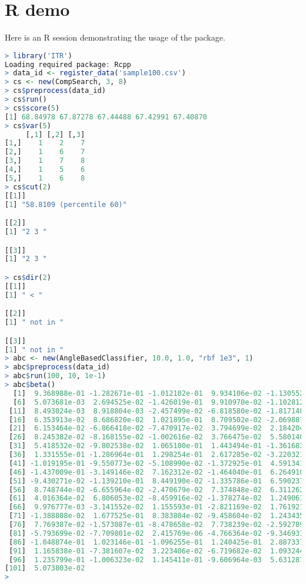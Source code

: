 \section{R demo}

Here is an R session demonstrating the usage of the package.

\begin{lstlisting}[language=R, showstringspaces=false]
> library('ITR')
Loading required package: Rcpp
> data_id <- register_data('sample100.csv')
> cs <- new(CompSearch, 3, 8)
> cs$preprocess(data_id)
> cs$run()
> cs$score(5)
[1] 68.84978 67.87278 67.44488 67.42991 67.40870
> cs$var(5)
     [,1] [,2] [,3]
[1,]    1    2    7
[2,]    1    6    7
[3,]    1    7    8
[4,]    1    5    6
[5,]    1    6    8
> cs$cut(2)
[[1]]
[1] "58.8109 (percentile 60)"

[[2]]
[1] "2 3 "

[[3]]
[1] "2 3 "

> cs$dir(2)
[[1]]
[1] " < "

[[2]]
[1] " not in "

[[3]]
[1] " not in "
> abc <- new(AngleBasedClassifier, 10.0, 1.0, "rbf 1e3", 1)
> abc$preprocess(data_id)
> abc$run(100, 10, 1e-1)
> abc$beta()
  [1]  9.368988e-01 -1.282671e-01 -1.012102e-01  9.934106e-02 -1.130552e-02
  [6]  5.073681e-03  2.694525e-02 -1.426019e-01  9.910970e-02 -1.102812e-01
 [11]  8.493024e-03  8.918804e-03 -2.457499e-02 -6.818580e-02 -1.817148e-02
 [16]  6.353913e-02  8.686820e-02  1.021895e-01  8.709502e-02 -2.069887e-02
 [21]  6.153464e-02 -6.866418e-02 -7.470917e-02  3.794699e-02  2.184204e-02
 [26]  8.245382e-02 -8.168155e-02 -1.002616e-02  3.766475e-02  5.580140e-02
 [31]  5.418532e-02 -9.802538e-02  1.065100e-01  1.443494e-01 -1.361683e-01
 [36]  1.331555e-01 -1.286964e-01  1.298254e-01  2.617285e-02 -3.220321e-02
 [41] -1.019195e-01 -9.550773e-02 -5.108990e-02 -1.372925e-01  4.591341e-02
 [46] -1.437009e-01 -3.149146e-02  7.162312e-02 -1.464040e-01  6.264910e-02
 [51] -9.430271e-02 -1.139210e-01  8.449190e-02 -1.335786e-01  6.590237e-02
 [56]  8.748744e-02 -6.655964e-02 -2.470679e-02  7.374848e-02  6.311262e-02
 [61]  4.016364e-02  6.806053e-02 -8.459916e-02 -1.378274e-02  1.249061e-02
 [66]  9.976777e-03 -3.141552e-02  1.155593e-01 -2.821169e-02  1.761921e-02
 [71] -1.388808e-02  1.677525e-01  8.383804e-02 -9.458604e-02  1.243435e-02
 [76]  7.769387e-02 -1.573087e-01 -8.478658e-02  7.738239e-02 -2.592789e-02
 [81] -5.793699e-02 -7.709801e-02  2.415769e-06 -4.766364e-02 -9.346931e-02
 [86] -1.048874e-01  1.023146e-01 -1.096255e-01  1.240425e-01  2.887337e-02
 [91]  1.165838e-01 -7.381607e-02  3.223406e-02 -6.719682e-02  1.093244e-01
 [96]  1.235799e-01 -1.006323e-02  1.145411e-01 -9.606964e-03  5.631287e-02
[101]  5.073803e-02
> 
\end{lstlisting}
